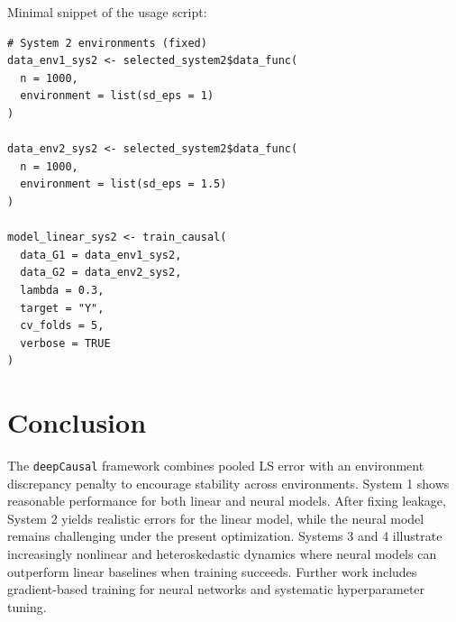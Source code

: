 \documentclass[11pt,a4paper]{article}
\begin{document}
\noindent Minimal snippet of the usage script:
\begin{lstlisting}[style=rstyle,caption={Excerpt from Experiments/UsageR.R}]
# System 2 environments (fixed)
data_env1_sys2 <- selected_system2$data_func(
  n = 1000,
  environment = list(sd_eps = 1)
)

data_env2_sys2 <- selected_system2$data_func(
  n = 1000,
  environment = list(sd_eps = 1.5)
)

model_linear_sys2 <- train_causal(
  data_G1 = data_env1_sys2,
  data_G2 = data_env2_sys2,
  lambda = 0.3,
  target = "Y",
  cv_folds = 5,
  verbose = TRUE
)
\end{lstlisting}

\section{Conclusion}
The \texttt{deepCausal} framework combines pooled LS error with an environment discrepancy penalty to encourage stability across environments. System 1 shows reasonable performance for both linear and neural models. After fixing leakage, System 2 yields realistic errors for the linear model, while the neural model remains challenging under the present optimization. Systems 3 and 4 illustrate increasingly nonlinear and heteroskedastic dynamics where neural models can outperform linear baselines when training succeeds. Further work includes gradient-based training for neural networks and systematic hyperparameter tuning.
\end{document}
